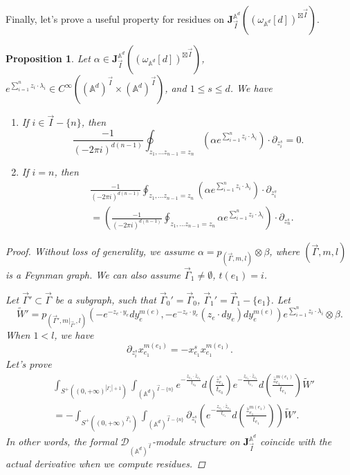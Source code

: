 \documentclass[11pt]{amsart}
\newtheorem{prop}[thm]{Proposition}
\theoremstyle{definition}
\theoremstyle{remark}
\numberwithin{equation}{section}
\begin{document}
Finally, let's prove a useful property for residues on $\mathbf{J}_{\vec{I}}^{\mathbb{A}^{d}}((\omega_{\mathbb{A}^{d}}[d])^{\boxtimes\vec{I}})$.
\begin{prop}\label{residue 0}
    Let $\alpha\in \mathbf{J}_{\vec{I}}^{\mathbb{A}^{d}}((\omega_{\mathbb{A}^{d}}[d])^{\boxtimes\vec{I}})$, $e^{\sum_{i=1}^{n}z_{i}\cdot\lambda_{i}}\in C^{\infty}((\mathbb{A}^{d})^{\vec{I}}\times (\mathbb{A}^{d})^{\vec{I}})$, and $1\leq s\leq d$. We have
    
    \begin{enumerate}
        \item If $i\in\vec{I}-\{n\}$, then
        $$
        \frac{-1}{(-2\pi i)^{d(n-1)}}\oint_{z_{1},\dots z_{n-1}=z_{n}}\left(\alpha e^{\sum_{i=1}^{n}z_{i}\cdot\lambda_{i}}\right)\cdot \partial_{z_{i}^{s}}=0.
        $$
        \item If $i=n$, then
        \begin{align*}
            &\frac{-1}{(-2\pi i)^{d(n-1)}}\oint_{z_{1},\dots z_{n-1}=z_{n}}\left(\alpha e^{\sum_{i=1}^{n}z_{i}\cdot\lambda_{i}}\right)\cdot \partial_{z_{i}^{s}}\\
            &=\left(\frac{-1}{(-2\pi i)^{d(n-1)}}\oint_{z_{1},\dots z_{n-1}=z_{n}}\alpha e^{\sum_{i=1}^{n}z_{i}\cdot\lambda_{i}}\right)\cdot \partial_{z_{n}^{s}}.
        \end{align*}
    \end{enumerate}
    \begin{proof}
        Without loss of generality, we assume $\alpha=p_{(\vec{\Gamma},m,l)}\otimes\beta$, where $(\vec{\Gamma},m,l)$ is a Feynman graph. We can also assume $\vec{\Gamma}_{1}\neq\emptyset$, $t(e_{1})=i$. 
        
        Let $\vec{\Gamma}'\subset\vec{\Gamma}$ be a subgraph, such that $\vec{\Gamma}_{0}'=\vec{\Gamma}_{0}$, $\vec{\Gamma}_{1}'=\vec{\Gamma}_{1}-\{e_{1}\}$. Let
        $$
        \tilde{W}'=p_{(\vec{\Gamma}',m|_{\vec{\Gamma}'},l)}(-e^{-z_{e}\cdot y_{e}}dy_{e}^{m(e)},-e^{-z_{e}\cdot y_{e}}(z_{e}\cdot dy_{e})dy_{e}^{m(e)})e^{\sum_{i=1}^{n}z_{i}\cdot\lambda_{i}}\otimes \beta.
        $$
        When $1<l$, we have 
        $$
        \partial_{z_{i}^{s}}x_{e_{1}}^{m(e_{1})}=-x_{e_{1}}^{s}x_{e_{1}}^{m(e_{1})}.
        $$
        Let's prove
        \begin{align*}
            &\int_{S^{+}((0,+\infty)^{|\Gamma_{_{1}}|+1})}\int_{(\mathbb{A}^{d})^{\vec{I}-\{n\}}}
            e^{-\frac{z_{e_{1}}\cdot \bar{z}_{e_{1}}}{t_{e_{0}}}}d(\frac{\bar{z}_{e_{1}}^{s}}{t_{e_{0}}})e^{-\frac{z_{e_{1}}\cdot \bar{z}_{e_{1}}}{t_{e_{1}}}}d(\frac{\bar{z}_{e_{1}}^{m(e_{1})}}{t_{e_{1}}})\tilde{W}'\\
            &=
            -\int_{S^{+}((0,+\infty)^{\vec{\Gamma}_{1}})}\int_{(\mathbb{A}^{d})^{\vec{I}-\{n\}}}\partial_{z_{i}^{s}}\left(e^{-\frac{z_{e_{1}}\cdot \bar{z}_{e_{1}}}{t_{e_{1}}}}d(\frac{\bar{z}_{e_{1}}^{m(e_{1})}}{t_{e_{1}}})\right)\tilde{W}'.
        \end{align*}
        In other words, the formal $\mathcal{D}_{(\mathbb{A}^{d})^{\vec{I}}}$-module structure on $\mathbf{J}_{\vec{I}}^{\mathbb{A}^{d}}$ coincide with the actual derivative when we compute residues. 


\end{proof}
\end{prop}
\end{document}
